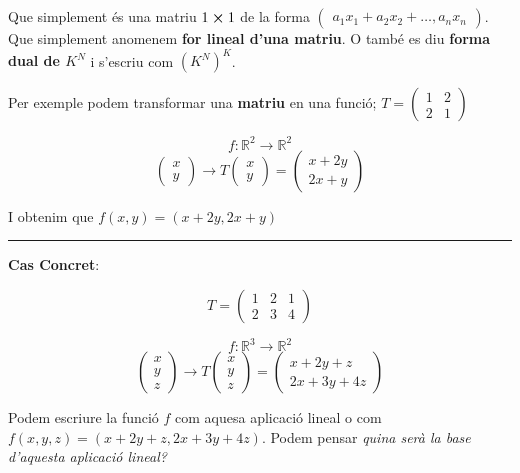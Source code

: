 \documentclass[12pt]{article}
\newcommand{\R}{\mathbb{R}}
\begin{document}
Que simplement és una matriu $1\cross 1$ de la forma $\begin{pmatrix}
    a_1x_1 + a_2x_2+\dots, a_nx_n
\end{pmatrix}$. Que simplement anomenem \textbf{for lineal d'una matriu}. O també es diu \textbf{forma dual de $K^N$} i s'escriu com $(K^N)^K$.

\begin{examplebox}{}
    Per exemple podem transformar una \textbf{matriu} en una funció; $T = \begin{pmatrix}
        1 & 2\\
        2 & 1
    \end{pmatrix}$

    \[f: \R^2 \rightarrow \R^2\]
    \[\begin{pmatrix}
        x\\
        y
    \end{pmatrix} \rightarrow T \begin{pmatrix}
        x\\
        y
    \end{pmatrix} = \begin{pmatrix}
        x + 2y\\
        2x +y
    \end{pmatrix}\]

    I obtenim que $f(x,y) = (x+2y, 2x+y)$
\end{examplebox}

\noindent\rule{\linewidth}{0.4pt}

\textbf{Cas Concret}:

\[T = \begin{pmatrix}
    1 & 2 & 1\\
    2 & 3 & 4
\end{pmatrix}\]

\[f: \R^3 \rightarrow \R^2\]
\[\begin{pmatrix}
    x\\
    y\\
    z
\end{pmatrix} \rightarrow T \begin{pmatrix}
    x\\
    y\\
    z
\end{pmatrix} = \begin{pmatrix}
    x + 2y + z \\
    2x + 3y + 4z
\end{pmatrix}\]

Podem escriure la funció $f$ com aquesa aplicació lineal o com $f(x,y,z) = (x+2y+z, 2x+3y+4z)$. Podem pensar \textit{quina serà la base d'aquesta aplicació lineal?}
\end{document}
